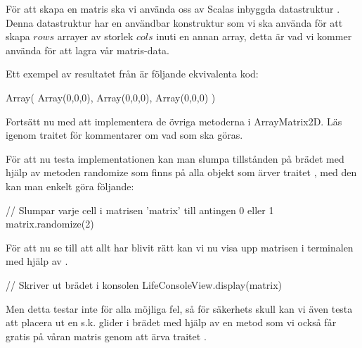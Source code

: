 
        För att skapa en matris ska vi använda oss av Scalas inbyggda datastruktur . Denna datastruktur har en användbar konstruktur  som vi ska använda för att skapa $rows$ arrayer av storlek $cols$ inuti en annan array, detta är vad vi kommer använda för att lagra vår matris-data.
        
        Ett exempel av resultatet från  är följande ekvivalenta kod:

\begin{Code}
Array(
	Array(0,0,0),
	Array(0,0,0),
	Array(0,0,0)	
)
\end{Code}



		Fortsätt nu med att implementera de övriga metoderna i ArrayMatrix2D. Läs igenom traitet  för kommentarer om vad som ska göras.



        För att nu testa implementationen kan man slumpa tillstånden på brädet med hjälp av metoden randomize som finns på alla objekt som ärver traitet , med den kan man enkelt göra följande:

\begin{Code}
// Slumpar varje cell i matrisen 'matrix' till antingen 0 eller 1
matrix.randomize(2)
\end{Code}

        För att nu se till att allt har blivit rätt kan vi nu visa upp matrisen i terminalen med hjälp av .

\begin{Code}
// Skriver ut brädet i konsolen
LifeConsoleView.display(matrix)
\end{Code}

        Men detta testar inte för alla möjliga fel, så för säkerhets skull kan vi även testa att placera ut en s.k. glider i brädet med hjälp av en metod  som vi också får gratis på våran matris genom att ärva traitet .

